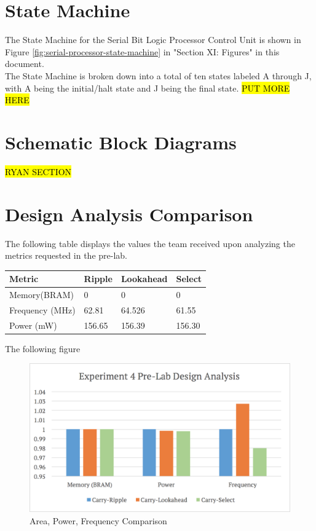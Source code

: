 \documentclass[journal, twocolumn, final,11pt,letterpaper]{IEEEtran}
\begin{document}
\section{State Machine}
The State Machine for the Serial Bit Logic Processor Control Unit is shown in Figure  \ref{fig:serial-processor-state-machine} in "Section XI: Figures" in this document. \\

The State Machine is broken down into a total of ten states labeled A through J, with A being the initial/halt state and J being the final state. \hl{PUT MORE HERE}
	
\section{Schematic Block Diagrams}
\hl{RYAN SECTION}


\section{Design Analysis Comparison}
The following table displays the values the team received upon analyzing the metrics requested in the pre-lab.
\begin{center}
	\begin{tabular}{l|lll}
		Metric & Ripple & Lookahead & Select \\ \hline
		Memory(BRAM) & 0 & 0 & 0 \\
		Frequency (MHz) & 62.81 & 64.526 & 61.55\\
		Power (mW) & 156.65 & 156.39 & 156.30\\
	\end{tabular}
\end{center}

The following figure 

\begin{figure} [H]
	\centering
	\includegraphics[scale=0.35]{pre-lab-design-analysis.png}
	\caption{Area, Power, Frequency Comparison\label{fig:pre-lab-design-analysis}}
\end{figure}
\end{document}
